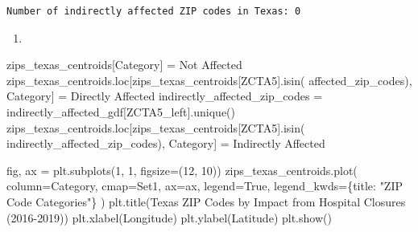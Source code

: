 \documentclass[
  letterpaper,
  DIV=11,
  numbers=noendperiod]{scrartcl}
\newenvironment{Shaded}{\begin{snugshade}}{\end{snugshade}}
\newcommand{\DecValTok}[1]{\textcolor[rgb]{0.68,0.00,0.00}{#1}}
\newcommand{\NormalTok}[1]{\textcolor[rgb]{0.00,0.23,0.31}{#1}}
\newcommand{\OperatorTok}[1]{\textcolor[rgb]{0.37,0.37,0.37}{#1}}
\newcommand{\StringTok}[1]{\textcolor[rgb]{0.13,0.47,0.30}{#1}}
\newcommand{\VariableTok}[1]{\textcolor[rgb]{0.07,0.07,0.07}{#1}}
\providecommand{\tightlist}{%
  \setlength{\itemsep}{0pt}\setlength{\parskip}{0pt}}\usepackage{longtable,booktabs,array}
\begin{document}
\begin{verbatim}
Number of indirectly affected ZIP codes in Texas: 0
\end{verbatim}

\begin{enumerate}
\def\labelenumi{\arabic{enumi}.}
\setcounter{enumi}{3}
\tightlist
\item
\end{enumerate}

\begin{Shaded}
\begin{Highlighting}[]
\NormalTok{zips\_texas\_centroids[}\StringTok{\textquotesingle{}Category\textquotesingle{}}\NormalTok{] }\OperatorTok{=} \StringTok{\textquotesingle{}Not Affected\textquotesingle{}}
\NormalTok{zips\_texas\_centroids.loc[zips\_texas\_centroids[}\StringTok{\textquotesingle{}ZCTA5\textquotesingle{}}\NormalTok{].isin(}
\NormalTok{    affected\_zip\_codes), }\StringTok{\textquotesingle{}Category\textquotesingle{}}\NormalTok{] }\OperatorTok{=} \StringTok{\textquotesingle{}Directly Affected\textquotesingle{}}
\NormalTok{indirectly\_affected\_zip\_codes }\OperatorTok{=}\NormalTok{ indirectly\_affected\_gdf[}\StringTok{\textquotesingle{}ZCTA5\_left\textquotesingle{}}\NormalTok{].unique()}
\NormalTok{zips\_texas\_centroids.loc[zips\_texas\_centroids[}\StringTok{\textquotesingle{}ZCTA5\textquotesingle{}}\NormalTok{].isin(}
\NormalTok{    indirectly\_affected\_zip\_codes), }\StringTok{\textquotesingle{}Category\textquotesingle{}}\NormalTok{] }\OperatorTok{=} \StringTok{\textquotesingle{}Indirectly Affected\textquotesingle{}}

\NormalTok{fig, ax }\OperatorTok{=}\NormalTok{ plt.subplots(}\DecValTok{1}\NormalTok{, }\DecValTok{1}\NormalTok{, figsize}\OperatorTok{=}\NormalTok{(}\DecValTok{12}\NormalTok{, }\DecValTok{10}\NormalTok{))}
\NormalTok{zips\_texas\_centroids.plot(}
\NormalTok{    column}\OperatorTok{=}\StringTok{\textquotesingle{}Category\textquotesingle{}}\NormalTok{,}
\NormalTok{    cmap}\OperatorTok{=}\StringTok{\textquotesingle{}Set1\textquotesingle{}}\NormalTok{,}
\NormalTok{    ax}\OperatorTok{=}\NormalTok{ax,}
\NormalTok{    legend}\OperatorTok{=}\VariableTok{True}\NormalTok{,}
\NormalTok{    legend\_kwds}\OperatorTok{=}\NormalTok{\{}\StringTok{\textquotesingle{}title\textquotesingle{}}\NormalTok{: }\StringTok{"ZIP Code Categories"}\NormalTok{\}}
\NormalTok{)}
\NormalTok{plt.title(}\StringTok{\textquotesingle{}Texas ZIP Codes by Impact from Hospital Closures (2016{-}2019)\textquotesingle{}}\NormalTok{)}
\NormalTok{plt.xlabel(}\StringTok{\textquotesingle{}Longitude\textquotesingle{}}\NormalTok{)}
\NormalTok{plt.ylabel(}\StringTok{\textquotesingle{}Latitude\textquotesingle{}}\NormalTok{)}
\NormalTok{plt.show()}
\end{Highlighting}
\end{Shaded}
\end{document}
